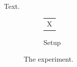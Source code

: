 \documentclass{article}
\begin{document}
Text.
\begin{figure}[h]
\centering
\begin{subfigure}{0.45\textwidth}
\centering
\begin{tabular}{c}X\end{tabular}
\caption{Setup}
\end{subfigure}
\caption{The experiment.}
\end{figure}
\end{document}
